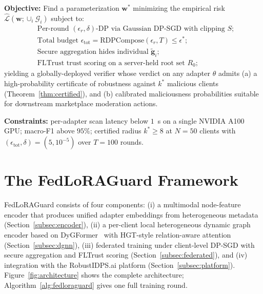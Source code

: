 \documentclass[12pt,a4paper]{article}
\theoremstyle{definition}
\theoremstyle{remark}
\newcommand{\modelname}{FedLoRAGuard}
\newcommand{\Lcal}{\mathcal{L}}
\newcommand{\Gcal}{\mathcal{G}}
\begin{document}
\noindent\textbf{Objective:} Find a parameterization $\mathbf{w}^*$ minimizing the empirical risk $\hat{\Lcal}(\mathbf{w}; \cup_i \Gcal_i)$ subject to:
\begin{align}
&\text{Per-round } (\epsilon_r, \delta)\text{-DP} \text{ via Gaussian DP-SGD with clipping } S; \nonumber \\
&\text{Total budget } \epsilon_{\mathrm{tot}} = \mathrm{RDPCompose}(\epsilon_r, T) \leq \epsilon^*; \\
&\text{Secure aggregation hides individual } \tilde{\mathbf{g}}_i; \nonumber \\
&\text{FLTrust trust scoring on a server-held root set } R_0; \nonumber
\end{align}
yielding a globally-deployed verifier whose verdict on any adapter $\theta$ admits (a) a high-probability certificate of robustness against $k^*$ malicious clients (Theorem~\ref{thm:certified}), and (b) calibrated maliciousness probabilities suitable for downstream marketplace moderation actions.

\noindent\textbf{Constraints:} per-adapter scan latency below $1$~s on a single NVIDIA A100 GPU; macro-F1 above $95\%$; certified radius $k^* \geq 8$ at $N = 50$ clients with $(\epsilon_{\mathrm{tot}}, \delta) = (5, 10^{-5})$ over $T = 100$ rounds.


\section{The \modelname{} Framework}
\label{sec:framework}

\modelname{} consists of four components: (i) a multimodal node-feature encoder that produces unified adapter embeddings from heterogeneous metadata (Section~\ref{subsec:encoder}), (ii) a per-client local heterogeneous dynamic graph encoder based on DyGFormer~\cite{yu2023dygformer} with HGT-style relation-aware attention~\cite{hu2020hgt} (Section~\ref{subsec:dgnn}), (iii) federated training under client-level DP-SGD with secure aggregation and FLTrust scoring (Section~\ref{subsec:federated}), and (iv) integration with the RobustIDPS.ai platform (Section~\ref{subsec:platform}). Figure~\ref{fig:architecture} shows the complete architecture; Algorithm~\ref{alg:fedloraguard} gives one full training round.
\end{document}
